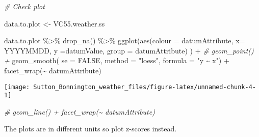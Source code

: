 \documentclass{article}
\newenvironment{Shaded}{\begin{snugshade}}{\end{snugshade}}
\newcommand{\AttributeTok}[1]{\textcolor[rgb]{0.77,0.63,0.00}{#1}}
\newcommand{\CommentTok}[1]{\textcolor[rgb]{0.56,0.35,0.01}{\textit{#1}}}
\newcommand{\ConstantTok}[1]{\textcolor[rgb]{0.00,0.00,0.00}{#1}}
\newcommand{\FunctionTok}[1]{\textcolor[rgb]{0.00,0.00,0.00}{#1}}
\newcommand{\NormalTok}[1]{#1}
\newcommand{\OtherTok}[1]{\textcolor[rgb]{0.56,0.35,0.01}{#1}}
\newcommand{\SpecialCharTok}[1]{\textcolor[rgb]{0.00,0.00,0.00}{#1}}
\newcommand{\StringTok}[1]{\textcolor[rgb]{0.31,0.60,0.02}{#1}}
\begin{document}
\begin{Shaded}
\begin{Highlighting}[]
\CommentTok{\# Check plot}

\NormalTok{data.to.plot }\OtherTok{\textless{}{-}}\NormalTok{ VC55.weather.ss}

\NormalTok{data.to.plot }\SpecialCharTok{\%\textgreater{}\%} \FunctionTok{drop\_na}\NormalTok{() }\SpecialCharTok{\%\textgreater{}\%}
\FunctionTok{ggplot}\NormalTok{(}\FunctionTok{aes}\NormalTok{(}\AttributeTok{colour =}\NormalTok{ datumAttribute, }\AttributeTok{x=}\NormalTok{ YYYYMMDD, }\AttributeTok{y =}\NormalTok{datumValue, }\AttributeTok{group =}\NormalTok{ datumAttribute) ) }\SpecialCharTok{+} 
 \CommentTok{\# geom\_point() +}
  \FunctionTok{geom\_smooth}\NormalTok{( }\AttributeTok{se =} \ConstantTok{FALSE}\NormalTok{, }\AttributeTok{method =} \StringTok{"loess"}\NormalTok{, }\AttributeTok{formula =} \StringTok{"y \textasciitilde{} x"}\NormalTok{) }\SpecialCharTok{+}
  \FunctionTok{facet\_wrap}\NormalTok{(}\SpecialCharTok{\textasciitilde{}}\NormalTok{ datumAttribute)}
\end{Highlighting}
\end{Shaded}

\begin{center}\texttt{[image: Sutton\_Bonnington\_weather\_files/figure-latex/unnamed-chunk-4-1]} \end{center}

\begin{Shaded}
\begin{Highlighting}[]
 \CommentTok{\#   geom\_line() + facet\_wrap(\textasciitilde{} datumAttribute)}
\end{Highlighting}
\end{Shaded}

The plots are in different units so plot z-scores instead.
\end{document}
